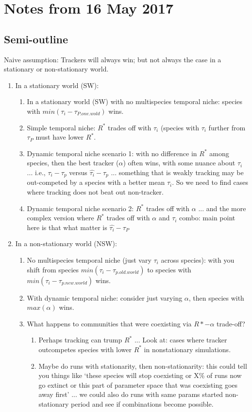 \documentclass[11pt,a4paper,oneside]{article}
\begin{document}
\section{Notes from 16 May 2017}

\subsection{Semi-outline} Naive assumption: Trackers will always win; but not always the case in a stationary or non-stationary world. 

\begin{enumerate} 
\item In a stationary world (SW):
\begin{enumerate} 
\item In a stationary world (SW) with no multispecies temporal niche: species with $min(\tau_i - \tau_{P.one.wold})$ wins. 
\item  Simple temporal niche: $R^*$ trades off with $\tau_i$ (species with $\tau_i$ further from $\tau_P$ must have lower $R^*$.
\item Dynamic temporal niche scenario 1: with no difference in $R^*$ among species, then the best tracker ($\alpha$) often wins, with some nuance about $\tau_i$ ... i.e., $\tau_i - \tau_p$ versus $\hat{\tau_i} - \tau_p$ ... something that is weakly tracking may be out-competed by a species with a better mean $\tau_i$. So we need to find cases where tracking does not beat out non-tracker. 
\item  Dynamic temporal niche scenario 2:  $R^*$ trades off with $\alpha$ ... and the more complex version where $R^*$ trades off with $\alpha$ and $\tau_i$ combo: main point here is that what matter is $\hat{\tau_i}-\tau_P$
\end{enumerate} 
\item  In a non-stationary world (NSW):
\begin{enumerate} 
\item No multispecies temporal niche (just vary $\tau_i$ across species): with you shift from species $min(\tau_i - \tau_{p.old.world})$ to species with $min(\tau_i - \tau_{p.new.world})$ wins. 
\item With dynamic temporal niche: consider just varying $\alpha$, then species with $max(\alpha)$ wins. 
\item What happens to communities that were coexisting via $R*-\alpha$ trade-off? 
\begin{enumerate}
\item Perhaps tracking can trump $R^*$ ... Look at: cases where tracker outcompetes species with lower $R^*$ in nonstationary simulations.
\item Maybe do runs with stationarity, then non-stationarity: this could tell you things like `these species will stop coexisting or X\% of runs now go extinct or this part of parameter space that was coexisting goes away first' ... we could also do runs with same params started non-stationary period and see if combinations become possible. \\ 
\end{enumerate}
\end{enumerate} 
\end{enumerate} 
\end{document}
